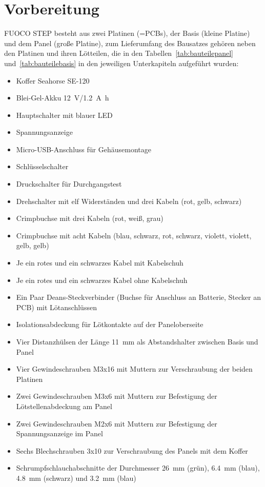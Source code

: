 \documentclass[paper=a4, open=any, numbers=noenddot]{scrbook}
\begin{document}
	\chapter{Vorbereitung}
		FUOCO STEP besteht aus zwei Platinen (=PCBs), der Basis (kleine Platine) und dem Panel (große Platine), zum Lieferumfang des Bausatzes gehören neben den Platinen und ihren Lötteilen, die in den Tabellen~\ref{tab:bauteilepanel} und~\ref{tab:bauteilebasis} in den jeweiligen Unterkapiteln aufgeführt wurden:
		\begin{itemize}
			\item Koffer Seahorse SE-120
			\item Blei-Gel-Akku \SI{12}{\volt}/\SI{1,2}{\ampere\hour}
			\item Hauptschalter mit blauer LED
			\item Spannungsanzeige
			\item Micro-USB-Anschluss für Gehäusemontage
			\item Schlüsselschalter
			\item Druckschalter für Durchgangstest
			\item Drehschalter mit elf Widerständen und drei Kabeln (rot, gelb, schwarz)
			\item Crimpbuchse mit drei Kabeln (rot, weiß, grau)
			\item Crimpbuchse mit acht Kabeln (blau, schwarz, rot, schwarz, violett, violett, gelb, gelb)
			\item Je ein rotes und ein schwarzes Kabel mit Kabelschuh
			\item Je ein rotes und ein schwarzes Kabel ohne Kabelschuh
			\item Ein Paar Deans-Steckverbinder (Buchse für Anschluss an Batterie, Stecker an PCB) mit Lötanschlüssen
			\item Isolationsabdeckung für Lötkontakte auf der Paneloberseite
			\item Vier Distanzhülsen der Länge \SI{11}{\milli\metre} als Abstandshalter zwischen Basis und Panel
			\item Vier Gewindeschrauben M3x16 mit Muttern zur Verschraubung der beiden Platinen
			\item Zwei Gewindeschrauben M3x6 mit Muttern zur Befestigung der Lötstellenabdeckung am Panel
			\item Zwei Gewindeschrauben M2x6 mit Muttern zur Befestigung der Spannungsanzeige im Panel
			\item Sechs Blechschrauben 3x10 zur Verschraubung des Panels mit dem Koffer
			\item Schrumpfschlauchabschnitte der Durchmesser \SI{26}{\milli\metre} (grün), \SI{6,4}{\milli\metre} (blau), \SI{4,8}{\milli\metre} (schwarz) und \SI{3,2}{\milli\metre} (blau)
		\end{itemize}
\end{document}

